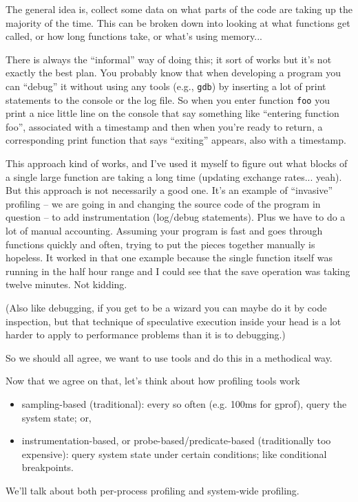 \documentclass[a4paper]{report}
\begin{document}
The general idea is, collect some data on what parts of the code are taking up the majority of the time. This can be broken down into looking at what functions get called, or how long functions take, or what's using memory...

There is always the ``informal'' way of doing this; it sort of works but it's not exactly the best plan. You probably know that when developing a program you can ``debug'' it without using any tools (e.g., \texttt{gdb}) by inserting a lot of print statements to the console or the log file. So when you enter function \texttt{foo} you print a nice little line on the console that say something like ``entering function foo'', associated with a timestamp and then when you're ready to return, a corresponding print function that says ``exiting'' appears, also with a timestamp.

This approach kind of works, and I've used it myself to figure out what blocks of a single large function are taking a long time (updating exchange rates... yeah). But this approach is not necessarily a good one.  It's an example of ``invasive'' profiling -- we are going in and changing the source code of the program in question -- to add instrumentation (log/debug statements). Plus we have to do a lot of manual accounting. Assuming your program is fast and goes through functions quickly and often, trying to put the pieces together manually is hopeless. It worked in that one example because the single function itself was running in the half hour range and I could see that the save operation was taking twelve minutes. Not kidding. 

(Also like debugging, if you get to be a wizard you can maybe do it by code inspection, but that technique of speculative execution inside your head is a lot harder to apply to performance problems than it is to debugging.)

So we should all agree, we want to use tools and do this in a methodical way.

Now that we agree on that, let's think about how profiling tools work\:

\begin{itemize}
\item sampling-based (traditional): every so often (e.g. 100ms for gprof), query the
system state; or,
\item instrumentation-based, or probe-based/predicate-based
  (traditionally too expensive): query system state under certain
  conditions; like conditional breakpoints.
\end{itemize}
We'll talk about both per-process profiling and system-wide profiling.
\end{document}
